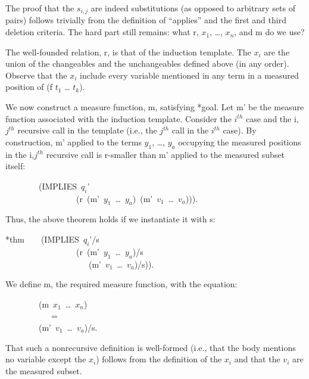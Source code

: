 \documentclass[11pt]{book}
\newenvironment{pubasis}{\begin{flushleft}\ttfamily\small}{\normalsize\rmfamily\end{flushleft}}
\begin{document}
The proof that the $s_{i,j}$ are indeed substitutions (as opposed
to arbitrary sets of pairs) follows trivially from the definition of ``applies''
and the first and third deletion criteria.  The hard part still remains:
what r, $x_{1}$, \ldots{}, $x_{n}$, and m do we use?

The well-founded relation, r, is that of the induction template.
The $x_{i}$ are the union of the changeables and the unchangeables
defined above (in any order).  Observe that the $x_{i}$ include every
variable mentioned in any term in a measured position of (f $t_{1}$ \ldots{} $t_{k}$).

We now construct a measure function, m, satisfying *goal.  Let m'
be the measure function associated with the induction template.  Consider
the $i^{th}$ case and the i,$j^{th}$ recursive call in the template (i.e.,
the $j^{th}$ call in the $i^{th}$ case).
By construction, m' applied to the terms $y_{1}$, \ldots{}, $y_{a}$ occupying
the measured positions in the i,$j^{th}$ recursive call is r-smaller
than m' applied to the measured subset itself:
\begin{pubasis}
~~~~~~~~(IMPLIES~$q_{i}$'\\
~~~~~~~~~~~~~~~~~(r~(m'~$y_{1}$~\ldots{}~$y_{a}$)~(m'~$v_{1}$~\ldots{}~$v_{a}$))).\\
\end{pubasis}
Thus, the above theorem holds if we instantiate it with s:
\begin{pubasis}
*thm~~~~(IMPLIES~$q_{i}$'/s\\
~~~~~~~~~~~~~~~~~(r~(m'~$y_{1}$~\ldots{}~$y_{a}$)/s\\
~~~~~~~~~~~~~~~~~~~~(m'~$v_{1}$~\ldots{}~$v_{a}$)/s)).\\
\end{pubasis}
We define m, the required measure function, with the equation:
\begin{pubasis}
~~~~~~~~(m~$x_{1}$~\ldots{}~$x_{n}$)\\
~~~~~~~~~~~=\\
~~~~~~~~(m'~$v_{1}$~\ldots{}~$v_{a}$)/s.\\
\end{pubasis}
That such a nonrecursive definition is well-formed (i.e., that the body
mentions no variable except the $x_{i}$) follows from the definition
of the $x_{i}$ and that the $v_{i}$ are the measured subset.
\end{document}
